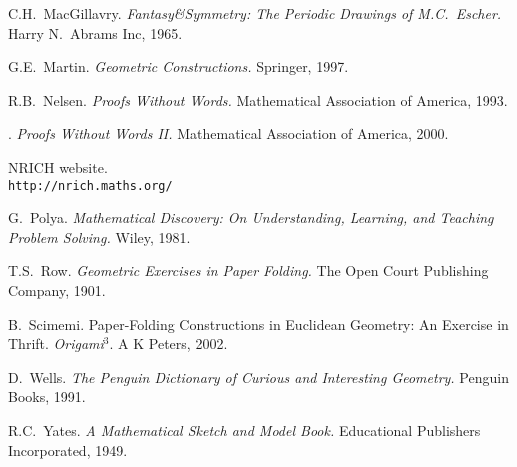 \begin{fullwidth}
\begin{thebibliography}{99}
 C.H.\ MacGillavry. \emph{Fantasy\&Symmetry: The Periodic Drawings of M.C.\ Escher.} Harry N.\ Abrams Inc, 1965.

 G.E.\ Martin. \textit{Geometric Constructions.}
  Springer, 1997.

 R.B.\ Nelsen. \emph{Proofs Without Words.} Mathematical Association of America, 1993.

 \bysame. \emph{Proofs Without Words II.} Mathematical Association of America, 2000.

 NRICH website.
\\ \texttt{http://nrich.maths.org/}

 G.\ Polya. \emph{Mathematical Discovery: On Understanding, Learning, and Teaching Problem Solving.} Wiley, 1981.

 T.S.\ Row. \emph{Geometric Exercises in Paper Folding.} The Open Court Publishing Company, 1901.

 B.\ Scimemi. Paper-Folding Constructions in Euclidean Geometry: An Exercise in Thrift. \textit{Origami$^3$}. A K Peters, 2002.


 D.\ Wells. \emph{The Penguin Dictionary of Curious and Interesting Geometry.} Penguin Books, 1991.

 R.C.\ Yates. \emph{A Mathematical Sketch and Model Book.} Educational Publishers Incorporated, 1949.

\end{thebibliography}

\end{fullwidth}



\printindex
